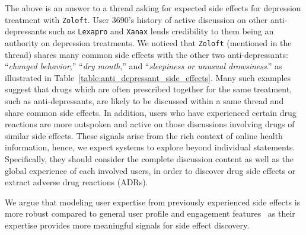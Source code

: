\documentclass{bmcart}
\begin{document}
The above is an answer to a thread asking for expected side effects for depression treatment with {\tt Zoloft}. User 3690's history of active discussion on other anti-depressants such as {\tt Lexapro} and {\tt Xanax} lends credibility to them being an authority on depression treatments. We noticed that {\tt Zoloft} (mentioned in the thread) shares many common side effects with the other two anti-depressants: ``\textit{changed behavior},'' ``\textit{dry mouth},'' and ``\textit{sleepiness or unusual
drowsiness}.'' as illustrated in 
Table~\ref{table:anti_depressant_side_effects}. Many such examples suggest that drugs which are often prescribed together for the same treatment, such as anti-depressants, are likely to be discussed within a same thread and share common side effects. 
In addition, users who have experienced certain drug reactions are more outspoken and active on those discussions involving drugs of similar side effects.
These signals arise from the rich context of online health information, hence, we expect systems to explore beyond individual statements. Specifically, they should consider the complete discussion content as well as the global experience of each involved users, in order to discover drug side effects or extract adverse drug reactions (ADRs).

We argue that modeling user expertise from previously experienced side effects is more robust compared to general user profile and engagement features~\cite{mukherjee2014people,vydiswaran2019identifying} as their expertise provides more meaningful signals for side effect discovery.
\end{document}
